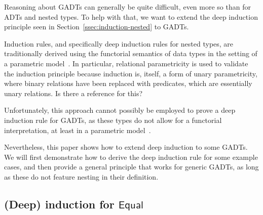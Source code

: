 \documentclass[9pt]{entcs}
\begin{document}

Reasoning about GADTs can generally be quite difficult,
even more so than for ADTs and nested types.
To help with that,
we want to extend the deep induction principle seen in Section~\ref{ssec:induction-nested} to GADTs.

Induction rules, and specifically deep induction rules for nested types,
are traditionally derived using the functorial semantics of data types
in the setting of a parametric model~\cite{jp19}.
In particular, relational parametricity is used to validate the induction principle because induction is, itself,
a form of unary parametricity, where binary relations have been replaced with predicates,
which are essentially unary relations.
{\color{blue} Is there a reference for this?}

Unfortunately, this approach cannot possibly be employed
to prove a deep induction rule for GADTs,
as these types do not allow for a functorial interpretation,
at least in a parametric model~\cite{jgj21}.

Nevertheless, this paper shows how to extend deep induction to some GADTs.
We will first demonstrate how to derive the deep induction rule for some example cases,
and then provide a general principle that works for generic GADTs,
as long as these do not feature nesting in their definition.



\subsection{(Deep) induction for $\mathsf{Equal}$}\label{sec:ind-equal}

\end{document}

